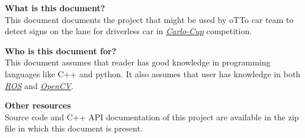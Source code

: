 \Large{\textbf{{What is this document?}}}\\
This document documents the project that might be used by oTTo car team to detect signs on the lane for driverless car in \href{https://wiki.ifr.ing.tu-bs.de/carolocup/}{\emph{Carlo-Cup}} competition.
\newline

\Large{\textbf{{Who is this document for?}}}\\
This document assumes that reader has good knowledge in programming languages like C++ and python. It also assumes that user has knowledge in both \href{http://wiki.ros.org/ROS/Tutorials}{\emph{ROS}} and \href{https://docs.opencv.org/4.2.0/d9/df8/tutorial_root.html}{\emph{OpenCV}}.
\newline

\Large{\textbf{{Other resources}}}\\
Source code and C++ API documentation of this project are available in the zip file in which this document is present.
